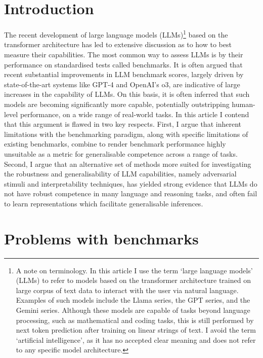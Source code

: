 \documentclass{article}
\begin{document}
\section{Introduction}
The recent development of large language models (LLMs)\footnote{A note on terminology. In this article I use the term ‘large language models’ (LLMs) to refer to models based on the transformer architecture trained on large corpus of text data to interact with the user via natural language. Examples of such models include the Llama series, the GPT series, and the Gemini series. Although these models are capable of tasks beyond language processing, such as mathematical and coding tasks, this is still performed by next token prediction after training on linear strings of text. I avoid the term ‘artificial intelligence’, as it has no accepted clear meaning and does not refer to any specific model architecture.} based on the transformer architecture has led to extensive discussion as to how to best measure their capabilities. The most common way to assess LLMs is by their performance on standardised tests called benchmarks. It is often argued that recent substantial improvements in LLM benchmark scores, largely driven by state-of-the-art systems like GPT-4 and OpenAI’s o3, are indicative of large increases in the capability of LLMs. On this basis, it is often inferred that such models are becoming significantly more capable, potentially outstripping human-level performance, on a wide range of real-world tasks. In this article I contend that this argument is flawed in two key respects. First, I argue that inherent limitations with the benchmarking paradigm, along with specific limitations of existing benchmarks, combine to render benchmark performance highly unsuitable as a metric for generalisable competence across a range of tasks. Second, I argue that an alternative set of methods more suited for investigating the robustness and generalisability of LLM capabilities, namely adversarial stimuli and interpretability techniques, has yielded strong evidence that LLMs do not have robust competence in many language and reasoning tasks, and often fail to learn representations which facilitate generalisable inferences.

\section{Problems with benchmarks}
\end{document}
